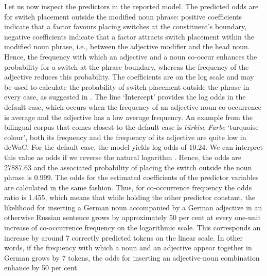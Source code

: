 Let us now inspect the predictors in the reported model. The predicted odds are for switch placement outside the modified noun phrase:  positive coefficients indicate that a factor favours placing switches at the constituent's boundary, negative coefficients indicate that a factor attracts switch placement within the modified noun phrase, i.e., between the adjective modifier and the head noun. Hence, the frequency with which an adjective and a noun co-occur enhances the probability for a switch at the phrase boundary, whereas the frequency of the adjective reduces this probability. The coefficients are on the log scale and may be used to calculate the probability of switch placement outside the phrase in every case, as suggested in \citet{ehret-etal-2014}. The line `Intercept' provides the log odds in the default case, which occurs when the frequency of an adjective-noun co-occurrence is average and the adjective has a low average frequency. An example from the bilingual corpus that comes closest to the default case is \textit{türkise Farbe} `turquoise colour', both its frequency and the frequency of its adjective are quite low in deWaC. For the default case, the model yields log odds of 10.24. We can interpret this value as odds if we reverse the natural logarithm \citep[cf.][]{ehret-etal-2014}. Hence, the odds are 27887.63 and the associated probability of placing the switch outside the noun phrase is 0.999. The odds for the estimated coefficients of the predictor variables are calculated in the same fashion. Thus, for co-occurrence frequency the odds ratio is 1.455, which means that while holding the other predictor constant, the likelihood for inserting a German noun accompanied by a German adjective in an otherwise Russian sentence grows by approximately 50 per cent at every one-unit increase of co-occurrence frequency on the logarithmic scale. This corresponds an increase by around 7 correctly predicted tokens on the linear scale. In other words, if the frequency with which a noun and an adjective appear together in German grows by 7 tokens, the odds for inserting an adjective-noun combination enhance by 50 per cent. 

